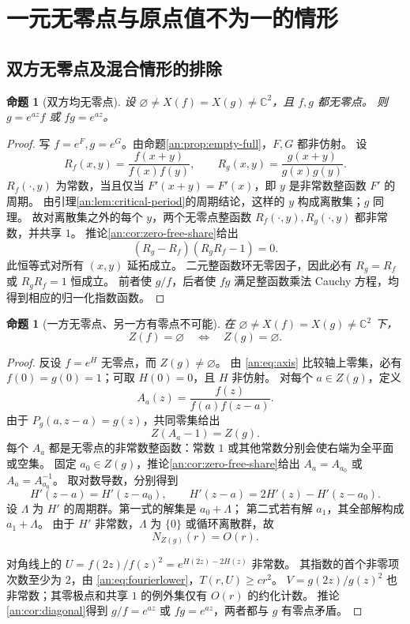 \documentclass[11pt,a4paper,oneside,openany]{book}
\theoremstyle{lecture}
\newtheorem{proposition}[theorem]{命题}
\newcommand{\C}{\mathbb C}
\numberwithin{equation}{section}
\begin{document}
\section{一元无零点与原点值不为一的情形}\label{an:sec:zerofree}
\subsection{双方无零点及混合情形的排除}
\begin{proposition}[双方均无零点]\label{an:prop:zero-free}
设 $\varnothing\ne X(f)=X(g)\ne\C^2$，且 $f,g$ 都无零点。
则 $g=e^{az}f$ 或 $fg=e^{az}$。
\end{proposition}
\begin{proof}
写 $f=e^F,g=e^G$。由命题\ref{an:prop:empty-full}，$F,G$ 都非仿射。
设
\[
 R_f(x,y)=\frac{f(x+y)}{f(x)f(y)},\qquad
 R_g(x,y)=\frac{g(x+y)}{g(x)g(y)}.
\]
$R_f(\cdot,y)$ 为常数，当且仅当 $F'(x+y)=F'(x)$，即 $y$ 是非常数整函数 $F'$ 的周期。
由引理\ref{an:lem:critical-period}的周期结论，这样的 $y$ 构成离散集；$g$ 同理。
故对离散集之外的每个 $y$，两个无零点整函数 $R_f(\cdot,y),R_g(\cdot,y)$ 都非常数，并共享 $1$。
推论\ref{an:cor:zero-free-share}给出
\[
 (R_g-R_f)(R_gR_f-1)=0.
\]
此恒等式对所有 $(x,y)$ 延拓成立。
二元整函数环无零因子，因此必有 $R_g=R_f$ 或 $R_gR_f=1$ 恒成立。
前者使 $g/f$，后者使 $fg$ 满足整函数乘法 Cauchy 方程，均得到相应的归一化指数函数。
\end{proof}

\begin{proposition}[一方无零点、另一方有零点不可能]\label{an:prop:mixed}
在 $\varnothing\ne X(f)=X(g)\ne\C^2$ 下，
\[
 Z(f)=\varnothing\quad\Longleftrightarrow\quad Z(g)=\varnothing.
\]
\end{proposition}
\begin{proof}
反设 $f=e^H$ 无零点，而 $Z(g)\ne\varnothing$。
由 \eqref{an:eq:axis} 比较轴上零集，必有 $f(0)=g(0)=1$；可取 $H(0)=0$，且 $H$ 非仿射。
对每个 $a\in Z(g)$，定义
\[
 A_a(z)=\frac{f(z)}{f(a)f(z-a)}.
\]
由于 $P_g(a,z-a)=g(z)$，共同零集给出
\begin{equation}\label{an:eq:mixedone}
 Z(A_a-1)=Z(g).
\end{equation}
每个 $A_a$ 都是无零点的非常数整函数：常数 $1$ 或其他常数分别会使右端为全平面或空集。
固定 $a_0\in Z(g)$，推论\ref{an:cor:zero-free-share}给出 $A_a=A_{a_0}$ 或 $A_a=A_{a_0}^{-1}$。
取对数导数，分别得到
\[
 H'(z-a)=H'(z-a_0),\qquad
 H'(z-a)=2H'(z)-H'(z-a_0).
\]
设 $\Lambda$ 为 $H'$ 的周期群。第一式的解集是 $a_0+\Lambda$；
第二式若有解 $a_1$，其全部解构成 $a_1+\Lambda$。
由于 $H'$ 非常数，$\Lambda$ 为 $\{0\}$ 或循环离散群，故
\[
 N_{Z(g)}(r)=O(r).
\]

对角线上的 $U=f(2z)/f(z)^2=e^{H(2z)-2H(z)}$ 非常数。
其指数的首个非零项次数至少为 $2$，由 \eqref{an:eq:fourierlower}，$T(r,U)\ge cr^2$。
$V=g(2z)/g(z)^2$ 也非常数；其零极点和共享 $1$ 的例外集仅有 $O(r)$ 的约化计数。
推论\ref{an:cor:diagonal}得到 $g/f=e^{az}$ 或 $fg=e^{az}$，两者都与 $g$ 有零点矛盾。
\end{proof}
\end{document}
